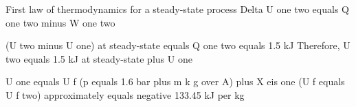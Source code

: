 First law of thermodynamics for a steady-state process  
Delta U one two equals Q one two minus W one two  

(U two minus U one) at steady-state equals Q one two equals 1.5 kJ  
Therefore, U two equals 1.5 kJ at steady-state plus U one  

U one equals U f (p equals 1.6 bar plus m k g over A)  
plus X eis one (U f equals U f two)  
approximately equals negative 133.45 kJ per kg